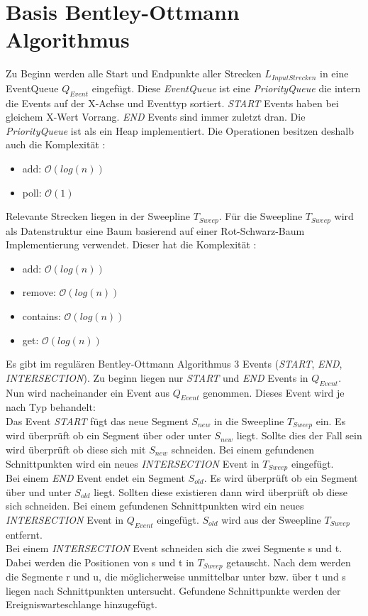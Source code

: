 \documentclass[conference]{IEEEtran}
\begin{document}
	\section{Basis Bentley-Ottmann Algorithmus}
	
	Zu Beginn werden alle Start und Endpunkte aller Strecken $L_{InputStrecken}$ in eine EventQueue $Q_{Event}$ eingefügt. Diese \textit{EventQueue} ist eine \textit{PriorityQueue} die intern die Events auf der X-Achse und Eventtyp sortiert. \textit{START} Events haben bei gleichem X-Wert Vorrang. \textit{END} Events sind immer zuletzt dran. Die \textit{PriorityQueue} ist als ein Heap implementiert. Die Operationen besitzen deshalb auch die Komplexität \cite{b2}:
	\begin{itemize}
		\item add: $\mathcal{O}(log(n))$
		\item poll: $\mathcal{O}(1)$
	\end{itemize}
	Relevante Strecken liegen in der Sweepline $T_{Sweep}$.
	Für die Sweepline $T_{Sweep}$ wird als Datenstruktur eine Baum basierend auf einer Rot-Schwarz-Baum Implementierung verwendet. Dieser hat die Komplexität \cite{b1}:
	\begin{itemize}
		\item add: $\mathcal{O}(log(n))$
		\item remove: $\mathcal{O}(log(n))$
		\item contains: $\mathcal{O}(log(n))$
		\item get: $\mathcal{O}(log(n))$
	\end{itemize}
	Es gibt im regulären Bentley-Ottmann Algorithmus 3 Events (\textit{START}, \textit{END}, \textit{INTERSECTION}).
	Zu beginn liegen nur \textit{START} und \textit{END} Events in $Q_{Event}$.\\
	Nun wird nacheinander ein Event aus $Q_{Event}$ genommen. Dieses Event wird je nach Typ behandelt:\\
	Das Event \textit{START} fügt das neue Segment $S_{new}$ in die Sweepline $T_{Sweep}$ ein.
	Es wird überprüft ob ein Segment über oder unter $S_{new}$ liegt. Sollte dies der Fall sein wird überprüft ob diese sich mit $S_{new}$ schneiden. Bei einem gefundenen Schnittpunkten wird ein neues \textit{INTERSECTION} Event in $T_{Sweep}$ eingefügt.\\
	Bei einem \textit{END} Event endet ein Segment $S_{old}$. Es wird überprüft ob ein Segment über und unter $S_{old}$ liegt. Sollten diese existieren dann wird überprüft ob diese sich schneiden. Bei einem gefundenen Schnittpunkten wird ein neues \textit{INTERSECTION} Event in $Q_{Event}$ eingefügt. $S_{old}$ wird aus der Sweepline $T_{Sweep}$ entfernt.\\
	Bei einem \textit{INTERSECTION} Event schneiden sich die zwei Segmente s und t. Dabei werden die Positionen von s und t in $T_{Sweep}$ getauscht. Nach dem werden die Segmente r und u, die möglicherweise unmittelbar unter bzw. über t und s liegen nach Schnittpunkten untersucht. Gefundene Schnittpunkte werden der Ereigniswarteschlange hinzugefügt.
\end{document}
